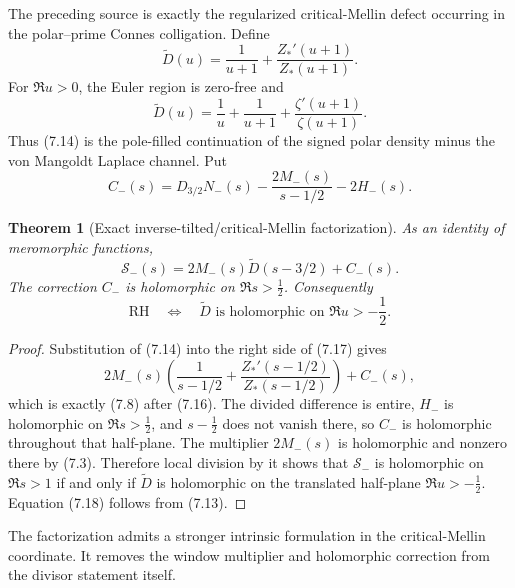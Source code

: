 \documentclass[11pt]{article}
\newtheorem{theorem}{Theorem}[section]
\newcommand{\cS}{\mathcal S}
\begin{document}
The preceding source is exactly the regularized critical-Mellin defect occurring in the
polar--prime Connes colligation.  Define
\[
 \widetilde D(u)=\frac1{u+1}+\frac{Z_*'(u+1)}{Z_*(u+1)}.
 \tag{7.14}
\]
For $\Re u>0$, the Euler region is zero-free and
\[
 \widetilde D(u)
 =\frac1u+\frac1{u+1}+\frac{\zeta'(u+1)}{\zeta(u+1)}.
 \tag{7.15}
\]
Thus \textup{(7.14)} is the pole-filled continuation of the signed polar density minus the
von Mangoldt Laplace channel.  Put
\[
 C_-(s)=D_{3/2}N_-(s)-\frac{2M_-(s)}{s-1/2}-2H_-(s).
 \tag{7.16}
\]

\begin{theorem}[Exact inverse-tilted/critical-Mellin factorization]
\label{thm:inverse-tilted-critical-mellin-factorization}
As an identity of meromorphic functions,
\[
 \cS_-(s)=2M_-(s)\widetilde D(s-3/2)+C_-(s).
 \tag{7.17}
\]
The correction $C_-$ is holomorphic on $\Re s>\frac12$.  Consequently
\[
 \boxed{
 \mathrm{RH}
 \quad\Longleftrightarrow\quad
 \widetilde D\text{ is holomorphic on }\Re u>-\frac12.}
 \tag{7.18}
\]
\end{theorem}

\begin{proof}
Substitution of \textup{(7.14)} into the right side of \textup{(7.17)} gives
\[
 2M_-(s)\left(\frac1{s-1/2}
   +\frac{Z_*'(s-1/2)}{Z_*(s-1/2)}\right)+C_-(s),
\]
which is exactly \textup{(7.8)} after \textup{(7.16)}.  The divided difference is entire,
$H_-$ is holomorphic on $\Re s>\frac12$, and $s-\frac12$ does not vanish there, so $C_-$ is
holomorphic throughout that half-plane.  The multiplier $2M_-(s)$ is holomorphic and nonzero
there by \textup{(7.3)}.  Therefore local division by it shows that $\cS_-$ is holomorphic on
$\Re s>1$ if and only if $\widetilde D$ is holomorphic on the translated half-plane
$\Re u>-\frac12$.  Equation \textup{(7.18)} follows from \textup{(7.13)}.
\end{proof}

The factorization admits a stronger intrinsic formulation in the critical-Mellin coordinate.
It removes the window multiplier and holomorphic correction from the divisor statement itself.
\end{document}
